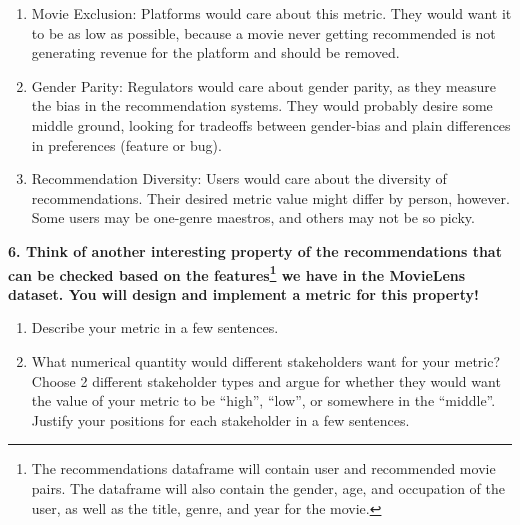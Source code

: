 \documentclass{article}
\begin{document}
\bigskip
\begin{mdframed}
\begin{enumerate}
    \item Movie Exclusion: Platforms would care about this metric. They would want it to be as low as possible, because a movie never getting recommended is not generating revenue for the platform and should be removed. 
    \item Gender Parity: Regulators would care about gender parity, as they measure the bias in the recommendation systems. They would probably desire some middle ground, looking for tradeoffs between gender-bias and plain differences in preferences (feature or bug). 
    \item Recommendation Diversity: Users would care about the diversity of recommendations. Their desired metric value might differ by person, however. Some users may be one-genre maestros, and others may not be so picky.  
\end{enumerate}
\end{mdframed}
\bigskip

\textbf{6. Think of another interesting property of the recommendations that can be checked based on the features\footnote{The recommendations dataframe will contain user and recommended movie pairs. The dataframe will also contain the gender, age, and occupation of the user, as well as the title, genre, and year for the movie.} we have in the MovieLens dataset. You will design and implement a metric for this property!}
\begin{enumerate}[label=\Alph*.]
\item Describe your metric in a few sentences. 
\item What numerical quantity would different stakeholders want for your metric? Choose 2 different stakeholder types and argue for whether they would want the value of your metric to be ``high'', ``low'', or somewhere in the ``middle''. Justify your positions for each stakeholder in a few sentences. 
\end{enumerate}
\end{document}
